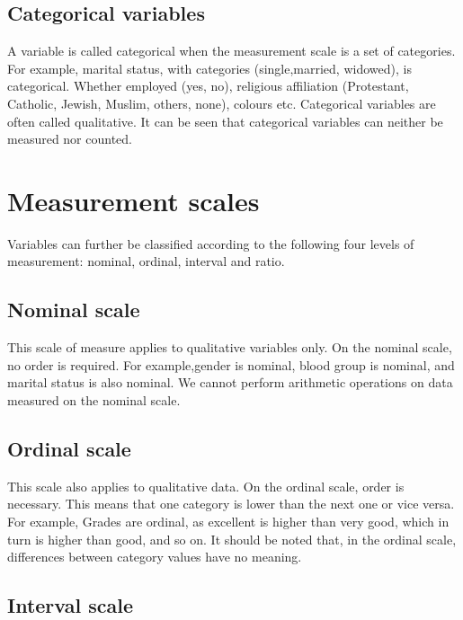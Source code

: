 \documentclass[
]{book}
\begin{document}
\subsection{Categorical variables}\label{categorical-variables}

A variable is called categorical when the measurement scale is a set of
categories. For example, marital status, with categories
(single,married, widowed), is categorical. Whether employed (yes, no),
religious affiliation (Protestant, Catholic, Jewish, Muslim, others,
none), colours etc. Categorical variables are often called qualitative.
It can be seen that categorical variables can neither be measured nor
counted.

\section{Measurement scales}\label{measurement-scales}

Variables can further be classified according to the following four
levels of measurement: nominal, ordinal, interval and ratio.

\subsection{Nominal scale}\label{nominal-scale}

This scale of measure applies to qualitative variables only. On the
nominal scale, no order is required. For example,gender is nominal,
blood group is nominal, and marital status is also nominal. We cannot
perform arithmetic operations on data measured on the nominal scale.

\subsection{Ordinal scale}\label{ordinal-scale}

This scale also applies to qualitative data. On the ordinal scale, order
is necessary. This means that one category is lower than the next one or
vice versa. For example, Grades are ordinal, as excellent is higher than
very good, which in turn is higher than good, and so on. It should be
noted that, in the ordinal scale, differences between category values
have no meaning.

\subsection{Interval scale}\label{interval-scale}
\end{document}
